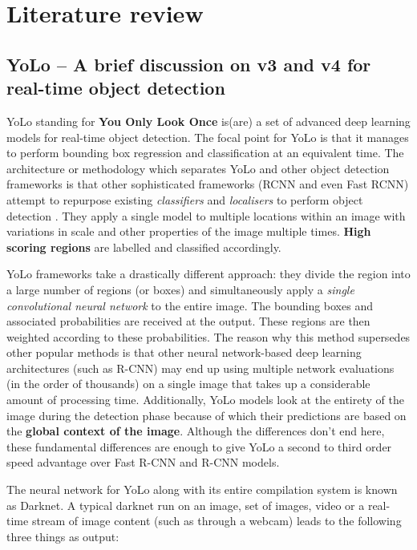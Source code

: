 \chapter{Literature review} \label{chapter2}

\section{YoLo – A brief discussion on v3 and v4 for real-time object
detection} \label{brief_discuss}
YoLo standing for \textbf{You Only Look Once} is(are) a set of
advanced deep learning models for real-time object detection. The
focal point for YoLo is that it manages to perform bounding box
regression and classification at an equivalent time. The architecture
or methodology which separates YoLo and other object detection
frameworks is that other sophisticated frameworks (RCNN and even Fast
RCNN) attempt to repurpose existing \textit{classifiers} and
\textit{localisers} to perform object detection
\cite{Srivastava2021}. They apply a single model to multiple
locations within an image with variations in scale and other
properties of the image multiple times. \textbf{High scoring regions}
are labelled and classified accordingly. \par

YoLo frameworks take a drastically different approach: they divide
the region into a large number of regions (or boxes) and
simultaneously apply a \textit{single convolutional neural network}
to the entire image. The bounding boxes and associated probabilities
are received at the output. These regions are then weighted according
to these probabilities. The reason why this method supersedes other
popular methods is that other neural network-based deep learning
architectures (such as R-CNN) may end up using multiple network
evaluations (in the order of thousands) on a single image that takes
up a considerable amount of processing time. Additionally, YoLo
models look at the entirety of the image during the detection phase
because of which their predictions are based on the \textbf{global
context of the image}. Although the differences don’t end here, these
fundamental differences are enough to give YoLo a second to third
order speed advantage over Fast R-CNN and R-CNN models. \par

The neural network for YoLo along with its entire compilation system
is known as Darknet. A typical darknet run on an image, set of
images, video or a real-time stream of image content (such as through
a webcam) leads to the following three things as output:


